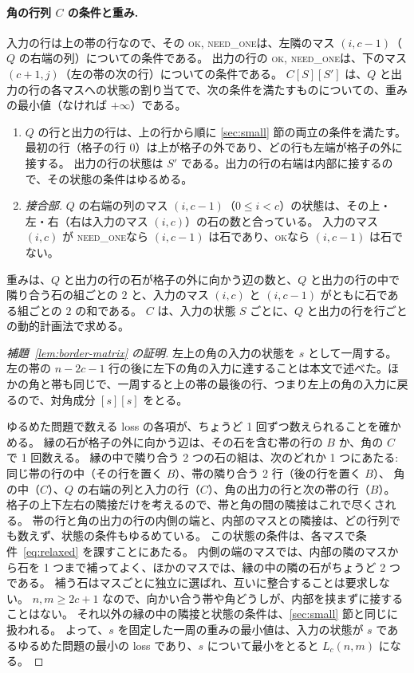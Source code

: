 \documentclass[11pt]{ltjsarticle}
\theoremstyle{definition}
\newcommand{\ok}{\textsc{ok}}
\newcommand{\needone}{\textsc{need\_one}}
\begin{document}
\paragraph{角の行列 $C$ の条件と重み.}
入力の行は上の帯の行なので、その \ok, \needone は、左隣のマス $(i,c-1)$（$Q$ の右端の列）についての条件である。
出力の行の \ok, \needone は、下のマス $(c+1,j)$（左の帯の次の行）についての条件である。
$C[S][S']$ は、$Q$ と出力の行の各マスへの状態の割り当てで、次の条件を満たすものについての、重みの最小値（なければ $+\infty$）である。
\begin{enumerate}
\item $Q$ の行と出力の行は、上の行から順に \ref{sec:small} 節の両立の条件を満たす。最初の行（格子の行 $0$）は上が格子の外であり、どの行も左端が格子の外に接する。
  出力の行の状態は $S'$ である。出力の行の右端は内部に接するので、その状態の条件はゆるめる。
\item \emph{接合部.} $Q$ の右端の列のマス $(i,c-1)$（$0\le i<c$）の状態は、その上・左・右（右は入力のマス $(i,c)$）の石の数と合っている。
  入力のマス $(i,c)$ が \needone なら $(i,c-1)$ は石であり、\ok なら $(i,c-1)$ は石でない。
\end{enumerate}
重みは、$Q$ と出力の行の石が格子の外に向かう辺の数と、$Q$ と出力の行の中で隣り合う石の組ごとの $2$ と、入力のマス $(i,c)$ と $(i,c-1)$ がともに石である組ごとの $2$ の和である。
$C$ は、入力の状態 $S$ ごとに、$Q$ と出力の行を行ごとの動的計画法で求める。

\begin{proof}[補題~\ref{lem:border-matrix} の証明]
左上の角の入力の状態を $s$ として一周する。
左の帯の $n-2c-1$ 行の後に左下の角の入力に達することは本文で述べた。ほかの角と帯も同じで、一周すると上の帯の最後の行、つまり左上の角の入力に戻るので、対角成分 $[s][s]$ をとる。

ゆるめた問題で数える loss の各項が、ちょうど 1 回ずつ数えられることを確かめる。
縁の石が格子の外に向かう辺は、その石を含む帯の行の $B$ か、角の $C$ で 1 回数える。
縁の中で隣り合う 2 つの石の組は、次のどれか 1 つにあたる:
同じ帯の行の中（その行を置く $B$）、帯の隣り合う 2 行（後の行を置く $B$）、
角の中（$C$）、$Q$ の右端の列と入力の行（$C$）、角の出力の行と次の帯の行（$B$）。
格子の上下左右の隣接だけを考えるので、帯と角の間の隣接はこれで尽くされる。
帯の行と角の出力の行の内側の端と、内部のマスとの隣接は、どの行列でも数えず、状態の条件もゆるめている。
この状態の条件は、各マスで条件~\eqref{eq:relaxed} を課すことにあたる。
内側の端のマスでは、内部の隣のマスから石を 1 つまで補ってよく、ほかのマスでは、縁の中の隣の石がちょうど 2 つである。
補う石はマスごとに独立に選ばれ、互いに整合することは要求しない。
$n,m\ge 2c+1$ なので、向かい合う帯や角どうしが、内部を挟まずに接することはない。
それ以外の縁の中の隣接と状態の条件は、\ref{sec:small} 節と同じに扱われる。
よって、$s$ を固定した一周の重みの最小値は、入力の状態が $s$ であるゆるめた問題の最小の loss であり、$s$ について最小をとると $L_c(n,m)$ になる。
\end{proof}
\end{document}
